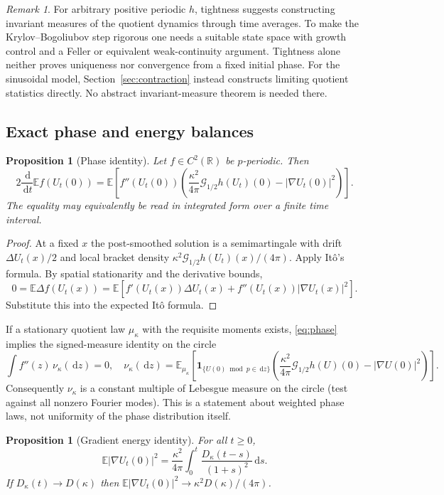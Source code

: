 \documentclass[11pt]{article}
\numberwithin{equation}{section}
\newtheorem{proposition}[theorem]{Proposition}
\theoremstyle{definition}
\theoremstyle{remark}
\newtheorem{remark}[theorem]{Remark}
\newcommand{\R}{\mathbb R}
\newcommand{\E}{\mathbb E}
\newcommand{\clG}{\mathcal G}
\newcommand{\dd}{\,\mathrm d}
\newcommand{\indic}{\mathbf 1}
\begin{document}
\begin{remark}
For arbitrary positive periodic $h$, tightness suggests constructing invariant measures of the quotient dynamics through time averages. To make the Krylov--Bogoliubov step rigorous one needs a suitable state space with growth control and a Feller or equivalent weak-continuity argument. Tightness alone neither proves uniqueness nor convergence from a fixed initial phase. For the sinusoidal model, Section~\ref{sec:contraction} instead constructs limiting quotient statistics directly. No abstract invariant-measure theorem is needed there.
\end{remark}
\subsection{Exact phase and energy balances}
\begin{proposition}[Phase identity]\label{prop:phase}
Let $f\in C^2(\R)$ be $p$-periodic. Then
\begin{equation}\label{eq:phase}
 2\frac{\dd}{\dd t}\E f(U_t(0))=
 \E\left[f''(U_t(0))\left(\frac{\kappa^2}{4\pi}\clG_{1/2}h(U_t)(0)-|\nabla U_t(0)|^2\right)\right].
\end{equation}
The equality may equivalently be read in integrated form over a finite time interval.
\end{proposition}
\begin{proof}
At a fixed $x$ the post-smoothed solution is a semimartingale with drift $\Delta U_t(x)/2$ and local bracket density $\kappa^2\clG_{1/2}h(U_t)(x)/(4\pi)$. Apply It\^o's formula. By spatial stationarity and the derivative bounds,
\[
 0=\E\Delta f(U_t(x))=\E[f'(U_t(x))\Delta U_t(x)+f''(U_t(x))|\nabla U_t(x)|^2].
\]
Substitute this into the expected It\^o formula.
\end{proof}
If a stationary quotient law $\mu_\kappa$ with the requisite moments exists, \eqref{eq:phase} implies the signed-measure identity on the circle
\begin{equation}\label{eq:stationaryphase}
 \int f''(z)\,\nu_\kappa(\dd z)=0,
 \quad \nu_\kappa(\dd z)=\E_{\mu_\kappa}\left[\indic_{\{U(0)\bmod p\in\dd z\}}
 \left(\frac{\kappa^2}{4\pi}\clG_{1/2}h(U)(0)-|\nabla U(0)|^2\right)\right].
\end{equation}
Consequently $\nu_\kappa$ is a constant multiple of Lebesgue measure on the circle (test against all nonzero Fourier modes). This is a statement about weighted phase laws, not uniformity of the phase distribution itself.
\begin{proposition}[Gradient energy identity]\label{prop:energy}
For all $t\ge0$,
\begin{equation}\label{eq:energy}
 \E|\nabla U_t(0)|^2=\frac{\kappa^2}{4\pi}\int_0^t\frac{D_\kappa(t-s)}{(1+s)^2}\dd s.
\end{equation}
If $D_\kappa(t)\to D(\kappa)$ then $\E|\nabla U_t(0)|^2\to\kappa^2D(\kappa)/(4\pi)$.
\end{proposition}
\end{document}
